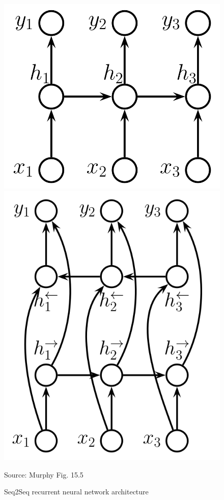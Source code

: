 \begin{figure}
\centering
\begin{minipage}{.45\textwidth}
\centering

\includegraphics[width=.8\textwidth]{seq2seq.png} 
\end{minipage}
\begin{minipage}{.45\textwidth}
\centering

\includegraphics[width=.8\textwidth]{bidiseq2seq.png}
\end{minipage}

\scriptsize Source: Murphy Fig. 15.5
\caption{Seq2Seq recurrent neural network architecture}
\label{fig:seq2seq}
\end{figure}

